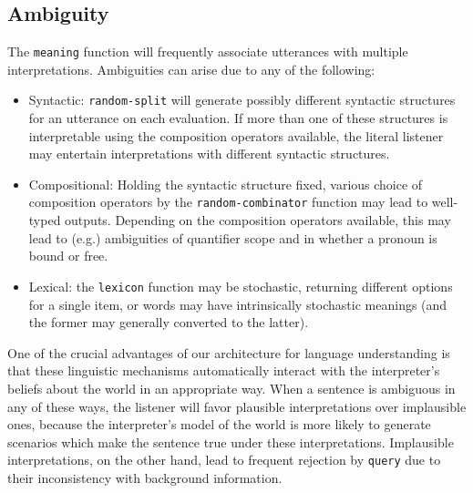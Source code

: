 \documentclass[12pt]{article}
\begin{document}
\subsection{\label{quantifiers}Ambiguity}
The \lstinline{meaning} function will frequently associate utterances with multiple interpretations. Ambiguities can arise due to any of the following:
\begin{itemize}
\item Syntactic: \lstinline{random-split} will generate possibly different syntactic structures for an utterance on each evaluation. 
If more than one of these structures is interpretable using the composition operators available, the literal listener may entertain interpretations with different syntactic structures.
\item Compositional: Holding the syntactic structure fixed, various choice of composition operators by the \lstinline{random-combinator} function may lead to well-typed outputs. 
Depending on the composition operators available, this may lead to (e.g.) ambiguities of quantifier scope and in whether a pronoun is bound or free.
\item Lexical: the \lstinline{lexicon} function may be stochastic, returning different options for a single item, or words may have intrinsically stochastic meanings (and the former may generally converted to the latter). 
\end{itemize}
One of the crucial advantages of our architecture for language understanding is that these linguistic mechanisms automatically interact with the interpreter's beliefs about the world in an appropriate way. 
When a sentence is ambiguous in any of these ways, the listener will favor plausible interpretations over implausible ones, because the interpreter's model of the world is more likely to generate scenarios which make the sentence true under these interpretations. 
Implausible interpretations, on the other hand, lead to frequent rejection by \lstinline{query} due to their inconsistency with background information.
\end{document}
